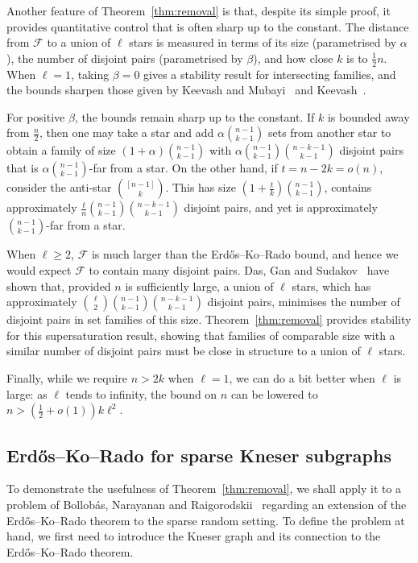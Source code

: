 \documentclass[11pt]{article}
\theoremstyle{definition}
\newcommand{\cF}{\mathcal{F}}
\newcommand{\3}{\bf{3}}
\begin{document}
Another feature of Theorem~\ref{thm:removal} is that, despite its simple proof, it provides quantitative control that is often sharp up to the constant.  The distance from $\cF$ to a union of $\ell$ stars is measured in terms of its size (parametrised by $\alpha$), the number of disjoint pairs (parametrised by $\beta$), and how close $k$ is to $\tfrac12 n$.  When $\ell = 1$, taking $\beta = 0$ gives a stability result for intersecting families, and the bounds sharpen those given by Keevash and Mubayi~\cite{km10} and Keevash~\cite{kee08}.

For positive $\beta$, the bounds remain sharp up to the constant.  If $k$ is bounded away from $\frac{n}{2}$, then one may take a star and add $\alpha \binom{n-1}{k-1}$ sets from another star to obtain a family of size $(1 + \alpha) \binom{n-1}{k-1}$ with $\alpha \binom{n-1}{k-1} \binom{n-k-1}{k-1}$ disjoint pairs that is $\alpha \binom{n-1}{k-1}$-far from a star.  On the other hand, if $t = n - 2k = o(n)$, consider the anti-star $\binom{[n-1]}{k}$.  This has size $\left(1 + \frac{t}{k} \right) \binom{n-1}{k-1}$, contains approximately $\frac{t}{n} \binom{n-1}{k-1} \binom{n-k-1}{k-1}$ disjoint pairs, and yet is approximately $\binom{n-1}{k-1}$-far from a star.

When $\ell \ge 2$, $\cF$ is much larger than the Erd\H{o}s--Ko--Rado bound, and hence we would expect $\cF$ to contain many disjoint pairs.  Das, Gan and Sudakov~\cite{dgs14} have shown that, provided $n$ is sufficiently large, a union of $\ell$ stars, which has approximately $\binom{\ell}{2} \binom{n-1}{k-1} \binom{n-k-1}{k-1}$ disjoint pairs, minimises the number of disjoint pairs in set families of this size.  Theorem~\ref{thm:removal} provides stability for this supersaturation result, showing that families of comparable size with a similar number of disjoint pairs must be close in structure to a union of $\ell$ stars.

Finally, while we require $n > 2k$ when $\ell = 1$, we can do a bit better when $\ell$ is large: as $\ell$ tends to infinity, the bound on $n$ can be lowered to $n > \left( \tfrac12 + o(1) \right) k \ell^2$.

\subsection{Erd\H{o}s--Ko--Rado for sparse Kneser subgraphs} \label{subsec:intro3}

To demonstrate the usefulness of Theorem~\ref{thm:removal}, we shall apply it to a problem of Bollob\'as, Narayanan and Raigorodskii~\cite{bnr14} regarding an extension of the Erd\H{o}s--Ko--Rado theorem to the sparse random setting.  To define the problem at hand, we first need to introduce the Kneser graph and its connection to the Erd\H{o}s--Ko--Rado theorem.
\end{document}
